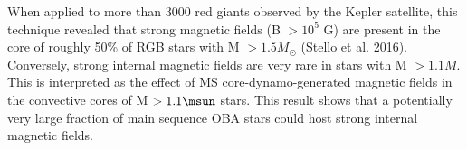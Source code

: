 When applied to more than 3000 red giants observed by the Kepler satellite, this technique revealed that
strong magnetic fields (B $> 10^5$ G) are present in the core of roughly 50\% of RGB stars with M $> 1.5M_\odot$ (Stello et al. 2016).
Conversely, strong internal magnetic fields are very rare in stars with M $> 1.1M$. This is interpreted as the
effect of MS core-dynamo-generated magnetic fields in the convective cores of M $> 1.1\msun$ stars.
This result shows that a potentially very large fraction of main sequence OBA stars could host strong internal magnetic fields.



